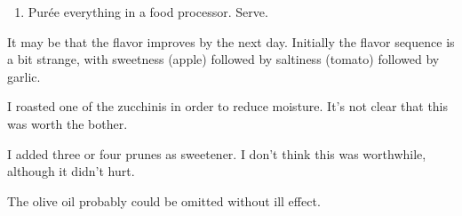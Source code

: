 
\begin{ingredients}
\end{ingredients}


\begin{recipe}
  \begin{enumerate}

  \item Pur\'ee everything in a food processor.  Serve.

  \end{enumerate}

  It may be that the flavor improves by the next day.  Initially the
  flavor sequence is a bit strange, with sweetness (apple) followed by
  saltiness (tomato) followed by garlic.

  I roasted one of the zucchinis in order to reduce moisture.  It's
  not clear that this was worth the bother.

  I added three or four prunes as sweetener.  I don't think this was
  worthwhile, although it didn't hurt.

  The olive oil probably could be omitted without ill effect.
\end{recipe}
